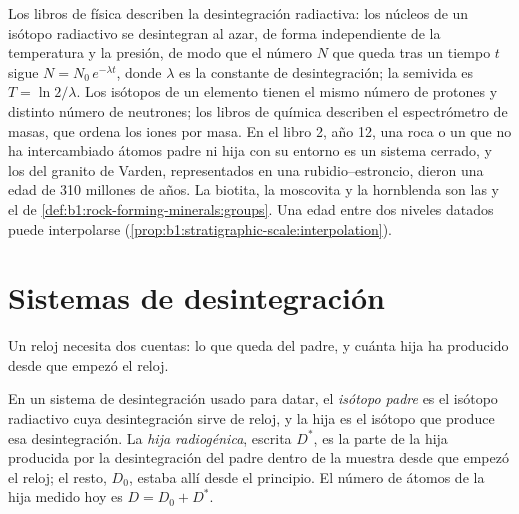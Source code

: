 \begin{recall}
Los libros de física describen la desintegración radiactiva: los núcleos de un isótopo radiactivo se desintegran al azar, de forma independiente de la temperatura y la presión, de modo que el número $N$ que queda tras un tiempo $t$ sigue $N = N_0\,e^{-\lambda t}$, donde
$\lambda$ es la constante de desintegración; la semivida es $T = \ln 2/\lambda$. Los isótopos de un elemento tienen el mismo número de protones y distinto número de neutrones; los libros de química describen el espectrómetro de masas, que ordena los iones por masa. En el libro 2, año 12, una roca o un  que no ha intercambiado átomos padre ni hija con su entorno es un sistema cerrado, y los  del granito de Varden, representados en una  rubidio--estroncio, dieron una edad de 310 millones de años. La biotita, la moscovita y la hornblenda son las  y el  de \cref{def:b1:rock-forming-minerals:groups}. Una edad entre dos niveles datados puede interpolarse (\cref{prop:b1:stratigraphic-scale:interpolation}).
\end{recall}

\section{Sistemas de desintegración}\label{sec:b1:radiometric-methods:systems}

Un reloj necesita dos cuentas: lo que queda del padre, y cuánta hija ha producido desde que empezó el reloj.

\begin{definition}\label{def:b1:radiometric-methods:radiogenic}
En un sistema de desintegración usado para datar, el \emph{isótopo padre} es el isótopo radiactivo cuya desintegración sirve de reloj, y la hija es el isótopo que produce esa desintegración. La \emph{hija
radiogénica}, escrita $D^*$, es la parte de la hija producida por la desintegración del padre dentro de la muestra desde que empezó el reloj; el resto, $D_0$, estaba allí desde el principio. El número de átomos de la hija medido hoy es $D = D_0 + D^*$.
\end{definition}

